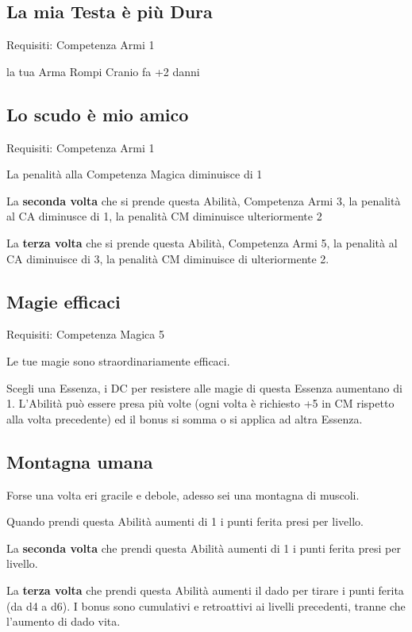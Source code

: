\documentclass[a4paper,11pt,twoside,openany]{book}
\begin{document}
\subsection{La mia Testa è più Dura}

Requisiti: Competenza Armi 1

la tua Arma Rompi Cranio fa +2 danni

\subsection{Lo scudo è mio amico}

Requisiti: Competenza Armi 1

La penalità alla Competenza Magica diminuisce di 1

La \textbf{seconda volta} che si prende questa Abilità, Competenza Armi 3, la penalità al CA diminusce di 1, la penalità CM diminuisce ulteriormente 2

La \textbf{terza volta} che si prende questa Abilità, Competenza Armi 5, la penalità al CA diminuisce di 3, la penalità CM diminuisce di ulteriormente 2.

\subsection{Magie efficaci}

Requisiti: Competenza Magica 5

Le tue magie sono straordinariamente efficaci.

Scegli una Essenza, i DC per resistere alle magie di questa Essenza aumentano di 1. L'Abilità può essere presa più volte (ogni volta è richiesto +5 in CM rispetto alla volta precedente) ed il bonus si somma o si applica ad altra Essenza.

\subsection{Montagna umana}

Forse una volta eri gracile e debole, adesso sei una montagna di muscoli.

Quando prendi questa Abilità aumenti di 1 i punti ferita presi per livello.

La \textbf{seconda volta} che prendi questa Abilità aumenti di 1 i punti ferita presi per livello. 

La \textbf{terza volta} che prendi questa Abilità aumenti il dado per tirare i punti ferita (da d4 a d6).
I bonus sono cumulativi e retroattivi ai livelli precedenti, tranne che l’aumento di dado vita.
\end{document}
